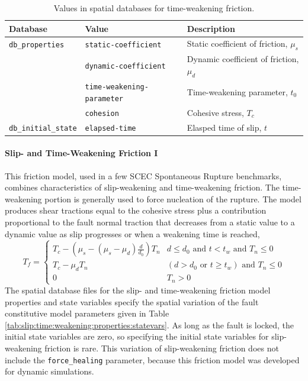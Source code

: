\begin{table}[htbp]
\caption{Values in spatial databases for time-weakening friction.}
\label{tab:time:weakening:properties:statevars}
\begin{tabular}{llp{2.5in}}
\textbf{Database} & \textbf{Value} & \textbf{Description}\\
\hline 
\texttt{db\_properties} & \texttt{static-coefficient} & Static coefficient of friction, $\mu_{s}$\\
 & \texttt{dynamic-coefficient} & Dynamic coefficient of friction, $\mu_{d}$\\
 & \texttt{time-weakening-parameter} & Time-weakening parameter, $t_{0}$\\
 & \texttt{cohesion} & Cohesive stress, $T_{c}$\\
\texttt{db\_initial\_state} & \texttt{elapsed-time} & Elasped time of slip, $t$\\
\hline 
\end{tabular}
\end{table}


\paragraph{Slip- and Time-Weakening Friction I}
\label{sec:friction:slip:time:weakening}

This friction model, used in a few SCEC Spontaneous Rupture benchmarks,
combines characteristics of slip-weakening and time-weakening friction.
The time-weakening portion is generally used to force nucleation of
the rupture. The model produces shear tractions equal to the cohesive
stress plus a contribution proportional to the fault normal traction
that decreases from a static value to a dynamic value as slip progresses
or when a weakening time is reached,
\begin{equation}
T_{f}=\begin{cases}
T_{c}-(\mu_{s}-(\mu_{s}-\mu_{d})\frac{d}{d_{0}})T_{n} & d\leq d_{0}\text{ and }t<t_{w}\text{ and }T_{n}\leq0\\
T_{c}-\mu_{d}T_{n} & (d>d_{0}\text{ or }t\ge t_{w})\text{ and }T_{n}\leq0\\
0 & T_{n}>0
\end{cases}
\end{equation}
The spatial database files for the slip- and time-weakening friction
model properties and state variables specify the spatial variation
of the fault constitutive model parameters given in Table \vref{tab:slip:time:weakening:properties:statevars}.
As long as the fault is locked, the initial state variables are zero,
so specifying the initial state variables for slip-weakening friction
is rare. This variation of slip-weakening friction does not include
the \texttt{force\_healing} parameter, because this friction model
was developed for dynamic simulations.

